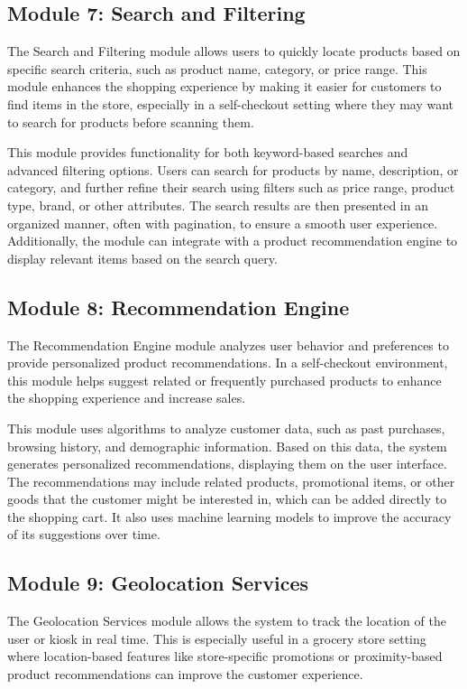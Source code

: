 \documentclass[conference]{IEEEtran}
\begin{document}
\subsection{Module 7: Search and Filtering}
The Search and Filtering module allows users to quickly locate products based on specific search criteria, such as product name, category, or price range. This module enhances the shopping experience by making it easier for customers to find items in the store, especially in a self-checkout setting where they may want to search for products before scanning them.

This module provides functionality for both keyword-based searches and advanced filtering options. Users can search for products by name, description, or category, and further refine their search using filters such as price range, product type, brand, or other attributes. The search results are then presented in an organized manner, often with pagination, to ensure a smooth user experience. Additionally, the module can integrate with a product recommendation engine to display relevant items based on the search query.
 
\subsection{Module 8: Recommendation Engine}
The Recommendation Engine module analyzes user behavior and preferences to provide personalized product recommendations. In a self-checkout environment, this module helps suggest related or frequently purchased products to enhance the shopping experience and increase sales.

This module uses algorithms to analyze customer data, such as past purchases, browsing history, and demographic information. Based on this data, the system generates personalized recommendations, displaying them on the user interface. The recommendations may include related products, promotional items, or other goods that the customer might be interested in, which can be added directly to the shopping cart. It also uses machine learning models to improve the accuracy of its suggestions over time.
 
\subsection{Module 9: Geolocation Services} 
The Geolocation Services module allows the system to track the location of the user or kiosk in real time. This is especially useful in a grocery store setting where location-based features like store-specific promotions or proximity-based product recommendations can improve the customer experience.
\end{document}
